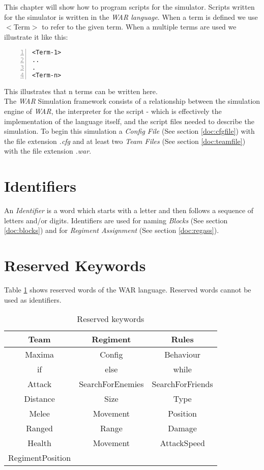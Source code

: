 This chapter will show how to program scripts for the simulator. Scripts written for the simulator is written in the {\it WAR language}. 
When a term is defined we use $<$Term$>$ to refer to the given term. 
When a multiple terms are used we illustrate it like this: \\

\begin{lstlisting}[basicstyle=\small\sffamily,
keywordstyle={\color{blue}},
comment={[l]{//}}, morecomment={[s]{/*}{*/}}, commentstyle=\itshape,
columns={[l]flexible}, numbers=left, numberstyle=\tiny,
frameround=fftt, frame=shadowbox, captionpos=b,
caption={Scripting}]
<Term-1>
..
.
<Term-n>
\end{lstlisting}
This illustrates that n terms can be written here. \\
The \textit{WAR} Simulation framework consists of a relationship between the simulation engine of \textit{WAR}, the interpreter for the script - which is effectively the implementation of the language itself, and the script files needed to describe the simulation.
To begin this simulation a {\it Config File} (See section \ref{doc:cfgfile}) with the file extension {\it .cfg} and at least two {\it Team Files} 
(See section \ref{doc:teamfile}) with the file extension {\it .war}.

\section{Identifiers}
	An {\it Identifier} is a word which starts with a letter and then follows a sequence of letters and/or digits.
	Identifiers are used for naming {\it Blocks} (See section \ref{doc:blocks}) and for {\it Regiment Assignment} (See section \ref{doc:regass}).
\section{Reserved Keywords}

Table \ref{reserved_keywords} shows reserved words of the WAR language. Reserved words cannot be used as identifiers.

\begin{table}[H]

\begin{tabular}{|c | c | c|}
\hline
 Team			&			Regiment					&		Rules				\\
\hline
 Maxima		&			Config						&		Behaviour 		\\						
\hline
 if					&			else							&		 while 				\\							
\hline
 Attack			&			SearchForEnemies 	&	SearchForFriends	\\					
\hline
 Distance		&		 	Size							&		Type					\\ 									
\hline
 Melee			&			Movement				&		Position			\\								
\hline
 Ranged		&			Range						&		Damage			\\								
\hline
 Health			&			Movement				&		AttackSpeed		\\						
\hline
 RegimentPosition & 								&								\\				
\hline
\end{tabular}
\caption{Reserved keywords}
\label{reserved_keywords}
\end{table}

